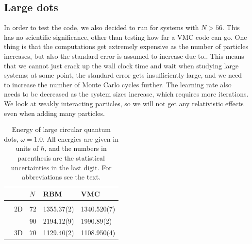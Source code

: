 \subsection{Large dots}
In order to test the code, we also decided to run for systems with $N>56$. This has no scientific significance, other than testing how far a VMC code can go. One thing is that the computations get extremely expensive as the number of particles increases, but also the standard error is assumed to increase due to.. This means that we cannot just crack up the wall clock time and wait when studying large systems; at some point, the standard error gets insufficiently large, and we need to increase the number of Monte Carlo cycles further. The learning rate also needs to be decreased as the system sizes increase, which requires more iterations.  We look at weakly interacting particles, so we will not get any relativistic effects even when adding many particles.

\begin{table}[H]
	\caption{Energy of large circular quantum dots, $\omega=1.0$. All energies are given in units of $\hbar$, and the numbers in parenthesis are the statistical uncertainties in the last digit. For abbreviations see the text.}
	\label{tab:largeQD}
	\begin{tabularx}{\textwidth}{R{1.6cm}R{2cm}R{2cm}R{3cm}R{3cm}} \hline\hline
		& \makecell{\\ \phantom{$N$}} & $N$ & RBM & VMC \\ \hline \\
		& 2D & 72 & 1355.37(2) & 1340.520(7) \\
		&& 90 & 2194.12(9) & 1990.89(2) \\
		& 3D & 70 & 1129.40(2) & 1108.950(4) \\
		\hline \hline
	\end{tabularx}
\end{table}

